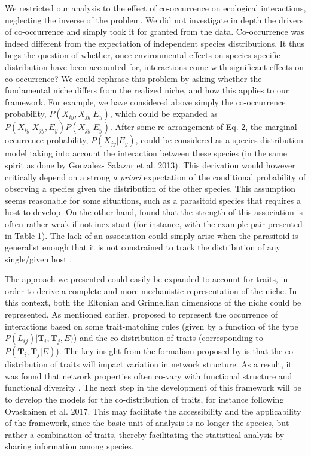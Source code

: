 \documentclass[12pt]{article}
\begin{document}
We restricted our analysis to the effect of co-occurrence on ecological
interactions, neglecting the inverse of the problem. We did not investigate in
depth the drivers of co-occurrence and simply took it for granted from the
data. Co-occurrence was indeed different from the expectation of independent
species distributions. It thus begs the question of whether, once
environmental effects on species-specific distribution have been accounted
for, interactions come with significant effects on co-occurrence? We could
rephrase this problem by asking whether the fundamental niche differs from the
realized niche, and how this applies to our framework. For example, we have
considered above simply the co-occurrence probability, $P(X_{iy},X_{jy}\lvert E_y)$,
which could be expanded as $P(X_{iy}\lvert X_{jy},E_y) P(X_{jy}\lvert  E_y )$. After some
re-arrangement of Eq. 2, the marginal occurrence probability, $P(X_{jy}\lvert E_y
)$, could be considered as a species distribution model taking into account
the interaction between these species (in the same spirit as done by Gonzalez-
Salazar et al. 2013). This derivation would however critically depend on a
strong \emph{a priori} expectation of the conditional probability of observing
a species given the distribution of the other species. This assumption seems
reasonable for some situations, such as a parasitoid species that requires a
host to develop. On the other hand, \citet{Cazelles2016b} found that the
strength of this association is often rather weak if not inexistant (for
instance, with the example pair presented in Table 1). The lack of an
association could simply arise when the parasitoid is generalist enough that
it is not constrained to track the distribution of any single/given host
\citep{Cazelles2015}.

The approach we presented could easily be expanded to account for traits, in
order to derive a complete and more mechanistic representation of the niche.
In this context, both the Eltonian and Grinnellian dimensions of the niche
could be represented. As mentioned earlier, \citealt{Gravel2016} proposed to
represent the occurrence of interactions based on some trait-matching rules
(given by a function of the type $P(L_{ij})\lvert \mathbf{T}_i, \mathbf{T}_j, E)$)
and the co-distribution of traits (corresponding to $P(\mathbf{T}_i,
\mathbf{T}_j\lvert E)$). The key  insight from the formalism proposed by
\citealt{Gravel2016} is that the co-distribution of traits will impact
variation in network structure. As a result, it was found that network
properties often co-vary with functional structure and functional diversity
\citealp{Laigle2018}. The next step in the development of this framework will
be to develop the models for the co-distribution of traits, for instance
following Ovaskainen et al. 2017. This may facilitate the accessibility and
the applicability of the framework, since the basic unit of analysis is no
longer the species, but rather a combination of traits, thereby facilitating
the statistical analysis by sharing information among species.
\end{document}
